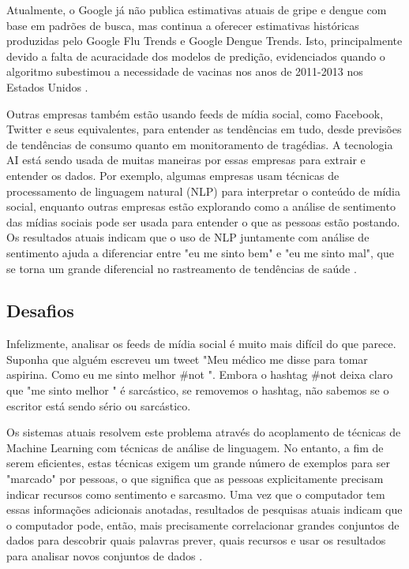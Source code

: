 \documentclass[
	12pt,				%
	openright,			%
	oneside,			%
	a4paper,			%
	english,			%
	spanish,			%
	brazil				%
	]{abntex2}
\begin{document}
Atualmente, o Google já não publica estimativas atuais de gripe e dengue com base em padrões de busca, mas continua a oferecer estimativas históricas produzidas pelo Google Flu Trends e Google Dengue Trends. Isto, principalmente devido a falta de acuracidade dos modelos de predição, evidenciados quando o algoritmo subestimou a necessidade de vacinas nos anos de 2011-2013 nos Estados Unidos  \cite{article_google_flu}.

Outras empresas também estão usando feeds de mídia social, como Facebook, Twitter e seus equivalentes, para entender as tendências em tudo, desde previsões de tendências de consumo quanto em monitoramento de tragédias. A tecnologia AI está sendo usada de muitas maneiras por essas empresas para extrair e entender os dados. Por exemplo, algumas empresas usam técnicas de processamento de linguagem natural (NLP) para interpretar o conteúdo de mídia social, enquanto outras empresas estão explorando como a análise de sentimento das mídias sociais pode ser usada para entender o que as pessoas estão postando. Os resultados atuais indicam que o uso de NLP juntamente com análise de sentimento ajuda a diferenciar entre "eu me sinto bem" e "eu me sinto mal", que se torna um grande diferencial no rastreamento de tendências de saúde \cite{book_social_machines}.
	
	\subsection*{Desafios}
Infelizmente, analisar os feeds de mídia social é muito mais difícil do que parece. Suponha que alguém escreveu um tweet "Meu médico me disse para tomar aspirina. Como eu me sinto melhor \#not ". Embora o hashtag \#not deixa claro que "me sinto melhor " é sarcástico, se removemos o hashtag, não sabemos se o escritor está sendo sério ou sarcástico.

Os sistemas atuais resolvem este problema através do acoplamento de técnicas de Machine Learning com técnicas de análise de linguagem. No entanto, a fim de serem eficientes, estas técnicas exigem um grande número de exemplos para ser "marcado" por pessoas, o que significa que as pessoas explicitamente precisam indicar recursos como sentimento e sarcasmo. Uma vez que o computador tem essas informações adicionais anotadas, resultados de pesquisas atuais indicam que o computador pode, então, mais precisamente correlacionar grandes conjuntos de dados para descobrir quais palavras prever, quais recursos e usar os resultados para analisar novos conjuntos de dados \cite{book_social_machines}.
\end{document}
